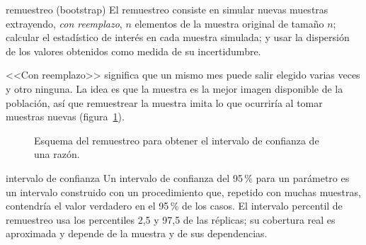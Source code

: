 \begin{definicion}{remuestreo (bootstrap)}
El remuestreo consiste en simular nuevas muestras extrayendo, \emph{con reemplazo}, $n$ elementos
de la muestra original de tamaño $n$; calcular el estadístico de interés en cada muestra
simulada; y usar la dispersión de los valores obtenidos como medida de su incertidumbre.
\end{definicion}

<<Con reemplazo>> significa que un mismo mes puede salir elegido varias veces y otro ninguna. La
idea es que la muestra es la mejor imagen disponible de la población, así que remuestrear la
muestra imita lo que ocurriría al tomar muestras nuevas (figura~\ref{fig:bootstrap}).

\begin{figure}[ht]
\centering
{}
\caption{Esquema del remuestreo para obtener el intervalo de confianza de una razón.}
\label{fig:bootstrap}
\end{figure}

\begin{definicion}{intervalo de confianza}
Un intervalo de confianza del 95\,{}\% para un parámetro es un intervalo construido con un
procedimiento que, repetido con muchas muestras, contendría el valor verdadero en el 95\,{}\% de
los casos. El intervalo percentil de remuestreo usa los percentiles 2,5 y 97,5 de las réplicas;
su cobertura real es aproximada y depende de la muestra y de sus dependencias.
\end{definicion}

